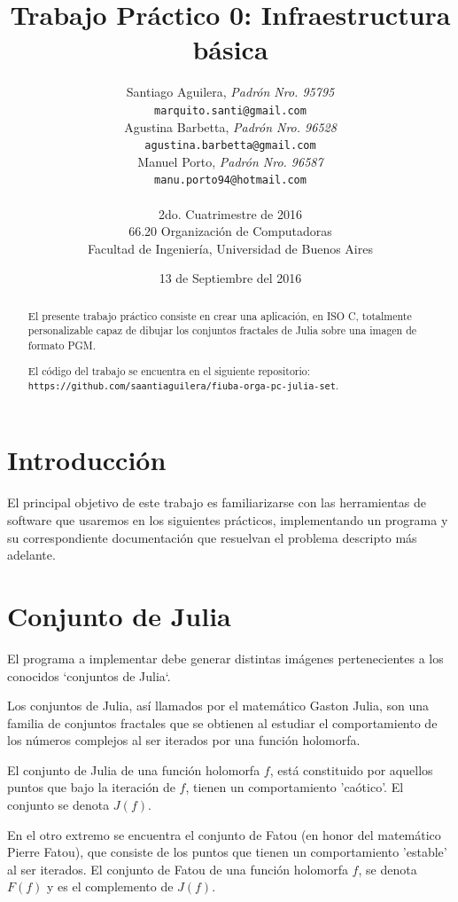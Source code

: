 \documentclass[10pt,a4paper]{article}
\title{\textbf{Trabajo Práctico 0: Infraestructura básica}}
\author{Santiago Aguilera, \textit{Padrón Nro. 95795}\\
        \texttt{marquito.santi@gmail.com}\\
        Agustina Barbetta, \textit{Padrón Nro. 96528}\\
        \texttt{agustina.barbetta@gmail.com}\\
        Manuel Porto, \textit{Padrón Nro. 96587}\\
        \texttt{manu.porto94@hotmail.com}\\
        \\[2.5ex]
        \normalsize{2do. Cuatrimestre de 2016}\\
        \normalsize{66.20 Organización de Computadoras}\\
        \normalsize{Facultad de Ingeniería, Universidad de Buenos Aires}\\
       }
\begin{document}
\date{13 de Septiembre del 2016}

\maketitle

\thispagestyle{empty}
\begin{abstract}
El presente trabajo práctico consiste en crear una aplicación, en ISO C, totalmente personalizable capaz de dibujar los conjuntos fractales de Julia sobre una imagen de formato PGM.

El código del trabajo se encuentra en el siguiente repositorio: \\
\texttt{https://github.com/saantiaguilera/fiuba-orga-pc-julia-set}.\\
\end{abstract}

\pagebreak

\tableofcontents

\pagebreak

\section{Introducción}
El principal objetivo de este trabajo es familiarizarse con las herramientas de software que usaremos en los siguientes prácticos\cite{Gxemul}\cite{NetBSD}, implementando un programa y su correspondiente documentación que resuelvan el problema descripto más adelante.

\section{Conjunto de Julia}
El programa a implementar debe generar distintas imágenes pertenecientes a los conocidos `conjuntos de Julia`.
\begin{displayquote}
Los conjuntos de Julia, así llamados por el matemático Gaston Julia, son una familia de conjuntos fractales que se obtienen al estudiar el comportamiento de los números complejos al ser iterados por una función holomorfa.

El conjunto de Julia de una función holomorfa $f$, está constituido por aquellos puntos que bajo la iteración de $f$, tienen un comportamiento 'caótico'. El conjunto se denota $J(f)$.

En el otro extremo se encuentra el conjunto de Fatou (en honor del matemático Pierre Fatou), que consiste de los puntos que tienen un comportamiento 'estable' al ser iterados. El conjunto de Fatou de una función holomorfa $f$, se denota $F(f)$ y es el complemento de $J(f)$.\cite{Juli}
\end{displayquote}
\end{document}
